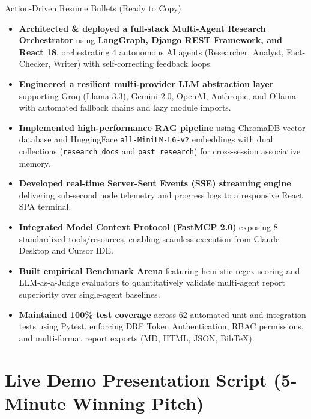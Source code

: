 \documentclass[11pt,a4paper,twoside]{report}
\begin{document}
\begin{conceptbox}{Action-Driven Resume Bullets (Ready to Copy)}
\begin{itemize}
    \item \textbf{Architected \& deployed a full-stack Multi-Agent Research Orchestrator} using \textbf{LangGraph, Django REST Framework, and React 18}, orchestrating 4 autonomous AI agents (Researcher, Analyst, Fact-Checker, Writer) with self-correcting feedback loops.
    \item \textbf{Engineered a resilient multi-provider LLM abstraction layer} supporting Groq (Llama-3.3), Gemini-2.0, OpenAI, Anthropic, and Ollama with automated fallback chains and lazy module imports.
    \item \textbf{Implemented high-performance RAG pipeline} using ChromaDB vector database and HuggingFace \texttt{all-MiniLM-L6-v2} embeddings with dual collections (\texttt{research\_docs} and \texttt{past\_research}) for cross-session associative memory.
    \item \textbf{Developed real-time Server-Sent Events (SSE) streaming engine} delivering sub-second node telemetry and progress logs to a responsive React SPA terminal.
    \item \textbf{Integrated Model Context Protocol (FastMCP 2.0)} exposing 8 standardized tools/resources, enabling seamless execution from Claude Desktop and Cursor IDE.
    \item \textbf{Built empirical Benchmark Arena} featuring heuristic regex scoring and LLM-as-a-Judge evaluators to quantitatively validate multi-agent report superiority over single-agent baselines.
    \item \textbf{Maintained 100\% test coverage} across 62 automated unit and integration tests using Pytest, enforcing DRF Token Authentication, RBAC permissions, and multi-format report exports (MD, HTML, JSON, BibTeX).
\end{itemize}
\end{conceptbox}

\section{Live Demo Presentation Script (5-Minute Winning Pitch)}
\end{document}
